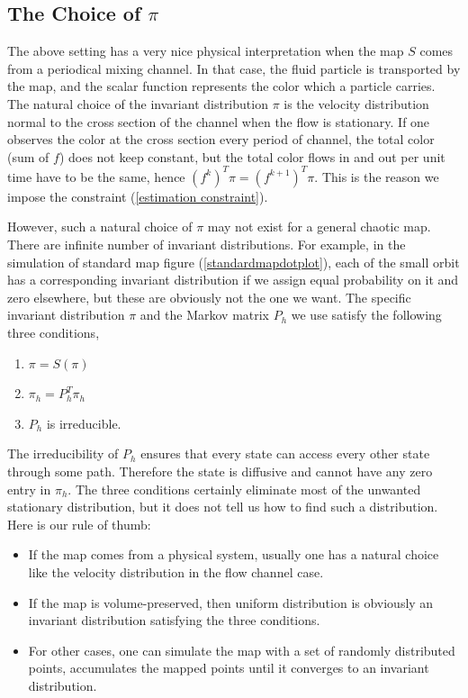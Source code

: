\documentclass{article}
\begin{document}
\subsection{The Choice of $\pi$}

The above setting has a very nice physical interpretation when the
map $S$ comes from a periodical mixing channel. In that case, the
fluid particle is transported by the map, and the scalar function
represents the color which a particle carries. The natural choice of
the invariant distribution $\pi$ is the velocity distribution normal
to the cross section of the channel when the flow is stationary. If
one observes the color at the cross section every period of channel,
the total color (sum of $f$) does not keep constant, but the total
color flows in and out per unit time have to be the same, hence
$(f^k)^T\pi =(f^{k+1})^T\pi$. This is the reason we impose the
constraint (\ref{estimation constraint}).

However, such a natural choice of $\pi$ may not exist for a general
chaotic map. There are infinite number of invariant distributions.
For example, in the simulation of standard map figure
(\ref{standardmapdotplot}), each of the small orbit has a
corresponding invariant distribution if we assign equal probability
on it and zero elsewhere, but these are obviously not the one we
want. The specific invariant distribution $\pi$ and the Markov
matrix $P_h$ we use satisfy the following three conditions,

\begin{enumerate}
\label{invariant equation}
 \item $\pi = S(\pi)$
 \item $\pi_h= P_h^T \pi_h$
 \item $P_h$ is irreducible.
\end{enumerate}

The irreducibility of $P_h$ ensures that every state can access every
other state through some path. Therefore the state is diffusive and
cannot have any zero entry in $\pi_h$. The three conditions
certainly eliminate most of the unwanted stationary distribution,
but it does not tell us how to find such a distribution. Here is our
rule of thumb:
\begin{itemize}
  \item If the map comes from a physical system, usually one has a
  natural choice like the velocity distribution in the flow channel case.
  \item If the map is volume-preserved, then uniform distribution is
  obviously an invariant distribution satisfying the three
  conditions.
  \item For other cases, one can simulate the map with a set of randomly
  distributed points, accumulates the mapped points until it converges to
  an invariant distribution.
\end{itemize}
\end{document}
